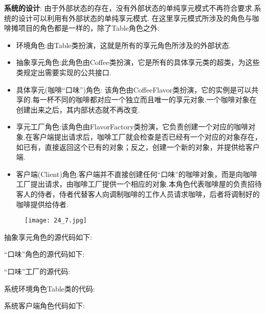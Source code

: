 \documentclass[../main.tex]{subfiles}
\begin{document}
\textbf{系统的设计}:
由于外部状态的存在，没有外部状态的单纯享元模式不再符合要求.系统的设计可以利用有外部状态的单纯享元模式.
在这里享元模式所涉及的角色与咖啡摊项目的角色都是一样的，除了Table角色之外:
\begin{itemize}
  \item 环境角色:由Table类扮演，这就是所有的享元角色所涉及的外部状态.
  \item 抽象享元角色:此角色由Coffee类扮演，它是所有的具体享元类的超类，为这些类规定出需要实现的公共接口.
  \item 具体享元(咖啡``口味'')角色: 该角色由CoffeeFlavor类扮演，它的实例是可以共享的.每一杯不同的咖啡都对应一个独立而且唯一的享元对象.一个咖啡对象在创建出来之后，其内部状态就不再改变.
  \item 享元工厂角色:该角色由FlavorFactory类扮演，它负责创建一个对应的咖啡对象.在客户端提出请求后，咖啡工厂就会检查是否已经有一个对应的对象存在，如已有，直接返回这个已有的对象；反之，创建一个新的对象，并提供给客户端.
  \item 客户端(Client)角色:客户端并不直接创建任何``口味''的咖啡对象，而是向咖啡工厂提出请求，由咖啡工厂提供一个相应的对象.本角色代表咖啡屋的负责招待客人的侍者，侍者代替客人向调制咖啡的工作人员请求咖啡，后者将调制好的咖啡提供给侍者.
\end{itemize}
%
\begin{figure}[H]
  \texttt{[image: 24\_7.jpg]}
\end{figure}
%
抽象享元角色的源代码如下:
%

%
``口味''角色的源代码如下:
%

%
``口味''工厂的源代码:
%

%
系统环境角色Table类的代码:
%

%
系统客户端角色代码如下:
%

%
\end{document}
